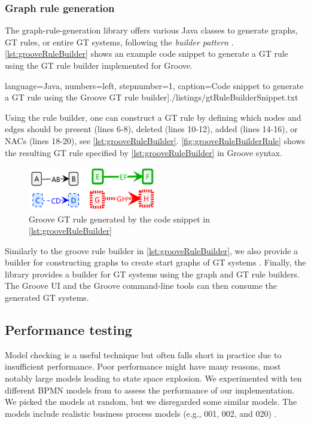 \documentclass{lmcs} %
\begin{document}
\subsubsection{Graph rule generation}
The graph-rule-generation library offers various Java classes to generate graphs, GT rules, or entire GT systems, following the \textit{builder pattern} \cite{gammaDesignPatternsElements1995}.
\autoref{lst:grooveRuleBuilder} shows an example code snippet to generate a GT rule using the GT rule builder implemented for Groove.

 language=Java, numbers=left,
    stepnumber=1, caption=Code snippet to generate a GT rule using the Groove GT rule builder]{./listings/gtRuleBuilderSnippet.txt}

Using the rule builder, one can construct a GT rule by defining which nodes and edges should be present (lines 6-8), deleted (lines 10-12), added (lines 14-16), or NACs (lines 18-20), see \autoref{lst:grooveRuleBuilder}.
\autoref{fig:grooveRuleBuilderRule} shows the resulting GT rule specified by \autoref{lst:grooveRuleBuilder} in Groove syntax.

\begin{figure}[ht]
    \centering
    \includegraphics[width=0.5\textwidth]{images/rule.pdf}
    \caption{Groove GT rule generated by the code snippet in \autoref{lst:grooveRuleBuilder}}
    \label{fig:grooveRuleBuilderRule}
\end{figure}

Similarly to the groove rule builder in \autoref{lst:grooveRuleBuilder}, we also provide a builder for constructing graphs to create start graphs of GT systems \cite{timkrauterLMCS2024Artifacts2023}.
Finally, the library provides a builder for GT systems using the graph and GT rule builders.
The Groove UI and the Groove command-line tools can then consume the generated GT systems.

\subsection{Performance testing}

Model checking is a useful technique but often falls short in practice due to insufficient performance.
Poor performance might have many reasons, most notably large models leading to state space explosion.
We experimented with ten different BPMN models from \cite{houhouFirstOrderLogicVerification2022} to assess the performance of our implementation.
We picked the models at random, but we disregarded some similar models.
The models include realistic business process models (e.g., 001, 002, and 020) \cite{houhouFirstOrderLogicVerification2022}.
\end{document}
